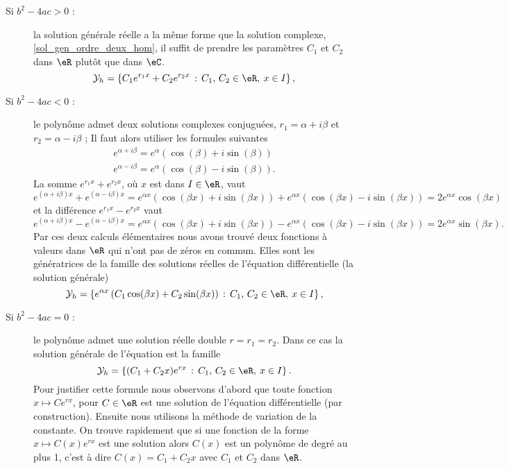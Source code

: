 \begin{description}
  \item[Si $b^2 - 4ac >0$ :] la solution générale réelle a la m\^eme forme que la solution complexe, \eqref{sol_gen_ordre_deux_hom}, il suffit de prendre les paramètres $C_1$ et $C_2$ dans $\eR$ plut\^ot que dans $\eC$.
\begin{equation}\label{sol_gen_reelle_ordre_deux_hom}
  \mathcal{Y}_h  = \left\{C_1 e^{r_1x} +C_2 e^{r_2x} \,:\, C_1,\, C_2 \in \eR, \: x\in I\right\},
\end{equation}
  \item[Si $b^2 - 4ac <0$ :] le polynôme admet deux solutions complexes conjuguées, $r_1 = \alpha + i \beta$ et $r_2 = \alpha - i \beta$ ; Il faut alors utiliser les formules suivantes
    \begin{equation}
      \begin{array}{l}
        e^{\alpha + i \beta} =e^{\alpha}(\cos(\beta) + i \sin(\beta))\\
        e^{\alpha - i \beta} =e^{\alpha}(\cos(\beta) - i \sin(\beta)).
      \end{array}
    \end{equation}
    La somme $e^{r_1x} +e^{r_2x}$, où $x$ est dans $I\in\eR$, vaut
    \[
    e^{(\alpha + i \beta)x} + e^{(\alpha - i \beta)x}=e^{\alpha x}(\cos(\beta x) + i \sin(\beta x )) + e^{\alpha x}(\cos(\beta x) - i \sin(\beta x)) =2 e^{\alpha x}\cos(\beta x)
    \]
    et la différence $e^{r_1x} -e^{r_2x}$ vaut
    \[
    e^{(\alpha + i \beta)x} - e^{(\alpha - i \beta)x}=e^{\alpha x}(\cos(\beta x) + i \sin(\beta x )) - e^{\alpha x}(\cos(\beta x) - i \sin(\beta x)) =2 e^{\alpha x}\sin(\beta x).
    \]
    Par ces deux calculs élémentaires nous avons trouvé deux fonctions à valeurs dans $\eR$ qui n'ont pas de zéros en commun. Elles sont les génératrices de la famille des solutions réelles de l'équation différentielle (la solution générale)
    \begin{equation}\label{sol_gen_reelle_ordre_deux_hom_complconj}
      \mathcal{Y}_h  = \left\{ e^{\alpha x}\left(C_1\cos(\beta x) +C_2\sin(\beta x)\right)  \,:\, C_1,\, C_2 \in \eR, \: x\in I\right\},
    \end{equation}
  \item[Si $b^2 - 4ac =0$ :] le polynôme admet une solution réelle double $r=r_1 = r_2$. Dans ce cas la solution générale de l'équation est la famille
    \begin{equation}\label{sol_gen_reelle_ordre_deux_hom_doublerac}
      \mathcal{Y}_h  = \left\{(C_1  +C_2x) e^{r x} \,:\, C_1,\, C_2 \in \eR, \: x\in I\right\}.
    \end{equation}
    Pour justifier cette formule nous observons d'abord que toute fonction $x\mapsto Ce^{rx}$, pour $C\in\eR$ est une solution de l'équation différentielle (par construction). Ensuite nous utilisons la méthode de variation de la constante. On trouve rapidement que si une fonction de la forme $x\mapsto C(x)e^{rx}$ est une solution alors $C(x)$ est un polynôme de degré au plus 1, c'est à dire $C(x) = C_1 + C_2 x$ avec $C_1$ et $C_2$ dans $\eR$.
\end{description}


